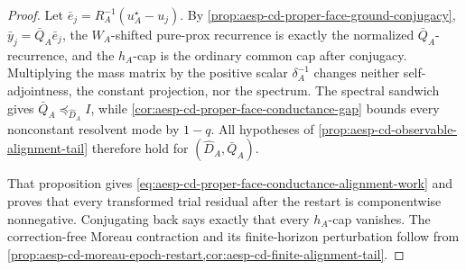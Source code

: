 \begin{proof}
Let \(\bar e_j=R_A^{-1}(u_A^\star-u_j)\).  By
\cref{prop:aesp-cd-proper-face-ground-conjugacy},
\(\bar y_j=\bar Q_A\bar e_j\), the \(W_A\)-shifted pure-prox recurrence is
exactly the normalized \(\bar Q_A\)-recurrence, and the \(h_A\)-cap is the
ordinary common cap after conjugacy.  Multiplying the mass matrix by the
positive scalar \(\delta_A^{-1}\) changes neither self-adjointness, the
constant projection, nor the spectrum.  The spectral sandwich gives
\(\bar Q_A\preceq_{\widehat D_A}I\), while
\cref{cor:aesp-cd-proper-face-conductance-gap} bounds every nonconstant
resolvent mode by \(1-q\).  All hypotheses of
\cref{prop:aesp-cd-observable-alignment-tail} therefore hold for
\((\widehat D_A,\bar Q_A)\).

That proposition gives \cref{eq:aesp-cd-proper-face-conductance-alignment-work}
and proves that every transformed trial residual after the restart is
componentwise nonnegative.  Conjugating back says exactly that every
\(h_A\)-cap vanishes.  The correction-free Moreau contraction and its
finite-horizon perturbation follow from
\cref{prop:aesp-cd-moreau-epoch-restart,cor:aesp-cd-finite-alignment-tail}.
\end{proof}

